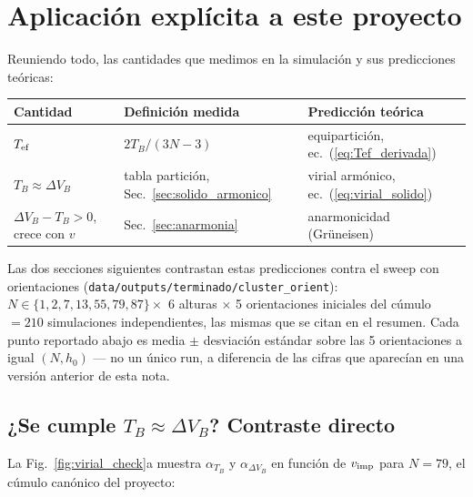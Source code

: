 \documentclass[11pt,a4paper]{article}
\begin{document}
\section{Aplicación explícita a este proyecto}
\label{sec:proyecto}

Reuniendo todo, las cantidades que medimos en la simulación y sus
predicciones teóricas:

\begin{center}
\begin{tabular}{lll}
\toprule
Cantidad & Definición medida & Predicción teórica \\
\midrule
$T_{\rm ef}$ & $2T_B/(3N-3)$ & equipartición, ec.~(\ref{eq:Tef_derivada}) \\
$T_B \approx \Delta V_B$ & tabla partición, Sec.~\ref{sec:solido_armonico} & virial armónico, ec.~(\ref{eq:virial_solido}) \\
$\Delta V_B - T_B > 0$, crece con $v$ & Sec.~\ref{sec:anarmonia} & anarmonicidad (Grüneisen) \\
\bottomrule
\end{tabular}
\end{center}

Las dos secciones siguientes contrastan estas predicciones contra el sweep
con orientaciones (\texttt{data/outputs/terminado/cluster\_orient}): $N\in\{1,2,7,13,
55,79,87\}\times$ 6 alturas $\times$ 5 orientaciones iniciales del cúmulo
$=210$ simulaciones independientes, las mismas que se citan en el
resumen. Cada punto reportado abajo es media $\pm$ desviación estándar
sobre las 5 orientaciones a igual $(N,h_0)$ --- no un único run, a
diferencia de las cifras que aparecían en una versión anterior de esta
nota.

\subsection{¿Se cumple $T_B\approx\Delta V_B$? Contraste directo}
\label{sec:contraste_directo}

La Fig.~\ref{fig:virial_check}a muestra $\alpha_{T_B}$ y
$\alpha_{\Delta V_B}$ en función de $v_{\rm imp}$ para $N=79$, el cúmulo
canónico del proyecto:
\end{document}
